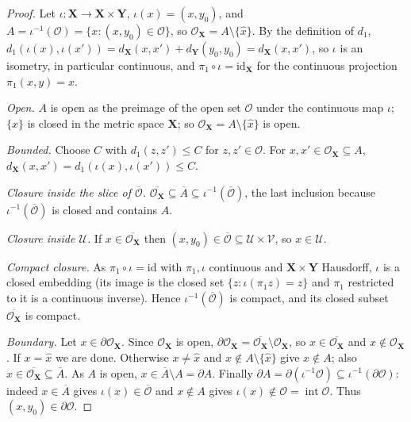 \begin{proof}
Let $\iota:\mathbf X\to\mathbf X\times\mathbf Y$, $\iota(x)=(x,y_0)$, and $A=\iota^{-1}(\mathcal O)=\{x:(x,y_0)\in\mathcal O\}$, so $\mathcal O_{\mathbf X}=A\setminus\{\hat x\}$. By the definition of $d_1$, $d_1(\iota(x),\iota(x'))=d_{\mathbf X}(x,x')+d_{\mathbf Y}(y_0,y_0)=d_{\mathbf X}(x,x')$, so $\iota$ is an isometry, in particular continuous, and $\pi_1\circ\iota=\mathrm{id}_{\mathbf X}$ for the continuous projection $\pi_1(x,y)=x$.

\emph{Open.} $A$ is open as the preimage of the open set $\mathcal O$ under the continuous map $\iota$; $\{\hat x\}$ is closed in the metric space $\mathbf X$; so $\mathcal O_{\mathbf X}=A\setminus\{\hat x\}$ is open.

\emph{Bounded.} Choose $C$ with $d_1(z,z')\le C$ for $z,z'\in\mathcal O$. For $x,x'\in\mathcal O_{\mathbf X}\subseteq A$, $d_{\mathbf X}(x,x')=d_1(\iota(x),\iota(x'))\le C$.

\emph{Closure inside the slice of $\overline{\mathcal O}$.} $\overline{\mathcal O_{\mathbf X}}\subseteq\overline A\subseteq\iota^{-1}(\overline{\mathcal O})$, the last inclusion because $\iota^{-1}(\overline{\mathcal O})$ is closed and contains $A$.

\emph{Closure inside $\mathcal U$.} If $x\in\overline{\mathcal O_{\mathbf X}}$ then $(x,y_0)\in\overline{\mathcal O}\subseteq\mathcal U\times\mathcal V$, so $x\in\mathcal U$.

\emph{Compact closure.} As $\pi_1\circ\iota=\mathrm{id}$ with $\pi_1,\iota$ continuous and $\mathbf X\times\mathbf Y$ Hausdorff, $\iota$ is a closed embedding (its image is the closed set $\{z:\iota(\pi_1z)=z\}$ and $\pi_1$ restricted to it is a continuous inverse). Hence $\iota^{-1}(\overline{\mathcal O})$ is compact, and its closed subset $\overline{\mathcal O_{\mathbf X}}$ is compact.

\emph{Boundary.} Let $x\in\partial\mathcal O_{\mathbf X}$. Since $\mathcal O_{\mathbf X}$ is open, $\partial\mathcal O_{\mathbf X}=\overline{\mathcal O_{\mathbf X}}\setminus\mathcal O_{\mathbf X}$, so $x\in\overline{\mathcal O_{\mathbf X}}$ and $x\notin\mathcal O_{\mathbf X}$. If $x=\hat x$ we are done. Otherwise $x\ne\hat x$ and $x\notin A\setminus\{\hat x\}$ give $x\notin A$; also $x\in\overline{\mathcal O_{\mathbf X}}\subseteq\overline A$. As $A$ is open, $x\in\overline A\setminus A=\partial A$. Finally $\partial A=\partial(\iota^{-1}\mathcal O)\subseteq\iota^{-1}(\partial\mathcal O)$: indeed $x\in\overline A$ gives $\iota(x)\in\overline{\mathcal O}$ and $x\notin A$ gives $\iota(x)\notin\mathcal O=\operatorname{int}\mathcal O$. Thus $(x,y_0)\in\partial\mathcal O$.
\end{proof}
